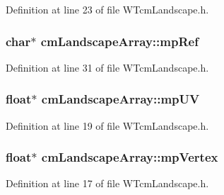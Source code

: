 Definition at line 23 of file WTcmLandscape.h.

\hypertarget{classcm_landscape_array_ac087951431be014c2fd42635422aca54}{
\subsubsection[{mpRef}]{\setlength{\rightskip}{0pt plus 5cm}char$\ast$ {\bf cmLandscapeArray::mpRef}}}
\label{classcm_landscape_array_ac087951431be014c2fd42635422aca54}


Definition at line 31 of file WTcmLandscape.h.

\hypertarget{classcm_landscape_array_a3c409cb07dfa1fbbf19c33c9ca85487b}{
\subsubsection[{mpUV}]{\setlength{\rightskip}{0pt plus 5cm}float$\ast$ {\bf cmLandscapeArray::mpUV}}}
\label{classcm_landscape_array_a3c409cb07dfa1fbbf19c33c9ca85487b}


Definition at line 19 of file WTcmLandscape.h.

\hypertarget{classcm_landscape_array_a1f26895155bdad61142e775187372840}{
\subsubsection[{mpVertex}]{\setlength{\rightskip}{0pt plus 5cm}float$\ast$ {\bf cmLandscapeArray::mpVertex}}}
\label{classcm_landscape_array_a1f26895155bdad61142e775187372840}


Definition at line 17 of file WTcmLandscape.h.

